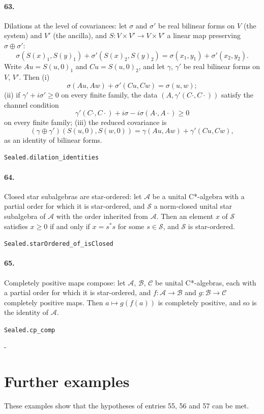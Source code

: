\documentclass[11pt]{article}
\makeatletter
\newcommand{\keepspace}[1]{\par\penalty-100\begingroup\setlength{\dimen@}{#1}\dimen@ii\pagegoal\advance\dimen@ii-\pagetotal\ifdim\dimen@>\dimen@ii\ifdim\dimen@ii>\z@\vfil\fi\break\fi\endgroup}
\makeatother
\begin{document}
\paragraph{63.} Dilations at the level of covariances: let $\sigma$ and $\sigma'$ be real bilinear forms on $V$ (the system) and $V'$ (the ancilla), and $S : V \times V' \to V \times V'$ a linear map preserving $\sigma \oplus \sigma'$: \[\sigma(S(x)_1, S(y)_1) + \sigma'(S(x)_2, S(y)_2) = \sigma(x_1, y_1) + \sigma'(x_2, y_2).\] Write $Au = S(u, 0)_1$ and $Cu = S(u, 0)_2$, and let $\gamma$, $\gamma'$ be real bilinear forms on $V$, $V'$. Then (i) \[\sigma(Au, Aw) + \sigma'(Cu, Cw) = \sigma(u, w);\] (ii) if $\gamma' + i\sigma' \ge 0$ on every finite family, the data $(A, \gamma'(C\cdot, C\cdot))$ satisfy the channel condition \[\gamma'(C\cdot, C\cdot) + i\sigma - i\sigma(A\cdot, A\cdot) \ge 0\] on every finite family; (iii) the reduced covariance is \[(\gamma \oplus \gamma')(S(u, 0), S(w, 0)) = \gamma(Au, Aw) + \gamma'(Cu, Cw),\] as an identity of bilinear forms.\par{\footnotesize\texttt{Sealed.dilation\_identities}}

\paragraph{64.} Closed star subalgebras are star-ordered: let $\mathcal A$ be a unital C*-algebra with a partial order for which it is star-ordered, and $\mathcal S$ a norm-closed unital star subalgebra of $\mathcal A$ with the order inherited from $\mathcal A$. Then an element $x$ of $\mathcal S$ satisfies $x \ge 0$ if and only if $x = s^* s$ for some $s \in \mathcal S$, and $\mathcal S$ is star-ordered.\par{\footnotesize\texttt{Sealed.starOrdered\_of\_isClosed}}

\paragraph{65.} Completely positive maps compose: let $\mathcal A$, $\mathcal B$, $\mathcal C$ be unital C*-algebras, each with a partial order for which it is star-ordered, and $f : \mathcal A \to \mathcal B$ and $g : \mathcal B \to \mathcal C$ completely positive maps. Then $a \mapsto g(f(a))$ is completely positive, and so is the identity of $\mathcal A$.\par{\footnotesize\texttt{Sealed.cp\_comp}}

\keepspace{14\baselineskip}\section*{Further examples}
These examples show that the hypotheses of entries 55, 56 and 57 can be met.
\end{document}

